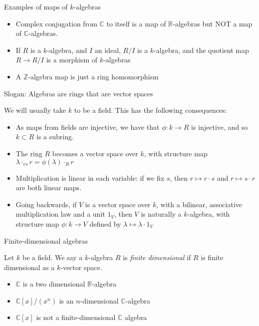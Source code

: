 \documentclass{beamer}
\newcommand{\C}{\mathbb{C}}
\newcommand{\Z}{\mathbb{Z}}
\newcommand{\R}{\mathbb{R}}
\begin{document}
\begin{frame}{Examples of maps of $k$-algebras}
\begin{itemize}



\item Complex conjugation from $\C$ to itself is a map of $\R$-algebras but NOT a map of $\C$-algebras.
\item If $R$ is a $k$-algebra, and $I$ an ideal, $R/I$ is a $k$-algebra, and the quotient map $R\to R/I$ is a morphism of $k$-algebras
\item A $\Z$-algebra map is just a ring homomorphism



\end{itemize}



\end{frame}


\begin{frame}{Slogan: Algebras are rings that are vector spaces}

We will usually take $k$ to be a field.  This has the following consequences:

\begin{itemize}
\item As maps from fields are injective, we have that $\phi:k\to R$ is injective, and so $k\subset R$ is a subring.
\item The ring $R$ becomes a vector space over $k$, with structure map $\lambda\cdot_{vs} r=\phi(\lambda)\cdot_R r$
\item Multiplication is linear in each variable: if we fix $s$, then $r\mapsto r\cdot s$ and $r\mapsto s\cdot r$ are both linear maps.
\item Going backwards, if $V$ is a vector space over $k$, with a bilinear, associative multiplication law and a unit $1_V$, then $V$ is naturally a $k$-algebra, with structure map $\phi:k\to V$ defined by $\lambda\mapsto \lambda\cdot 1_V$

\end{itemize}

\end{frame}

\begin{frame}{Finite-dimensional algebras }
\begin{definition} Let $k$ be a field.  We say a $k$-algebra $R$ is \emph{finite dimensional} if $R$ is finite dimensional as a $k$-vector space.
\end{definition}

\begin{example}
\begin{itemize}
\item $\C$ is a two dimensional $\R$-algebra
\item $\C[x]/(x^n)$ is an $n$-dimensional $\C$-algebra
\item $\C[x]$ is \alert{not} a finite-dimensional $\C$ algebra
\end{itemize}
\end{example}
\end{frame}
\end{document}
